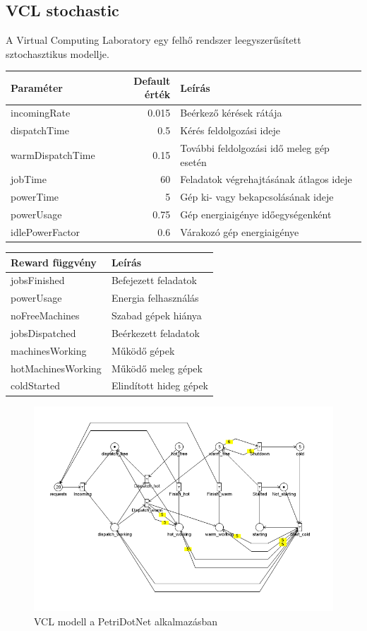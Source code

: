 \subsection{VCL stochastic}

A Virtual Computing Laboratory egy felhő rendszer leegyszerűsített sztochasztikus modellje.
\begin{center}
	\begin{tabular}{lrl}
		\textbf{\textbf{Paraméter}} & \textbf{Default érték} & \textbf{Leírás} \\
		\hline
		incomingRate & 0.015 & Beérkező kérések rátája\\
		dispatchTime & 0.5 & Kérés feldolgozási ideje\\
		warmDispatchTime & 0.15 & További feldolgozási idő meleg gép esetén\\
		jobTime & 60 & Feladatok végrehajtásának átlagos ideje\\
		powerTime & 5 & Gép ki- vagy bekapcsolásának ideje\\
		powerUsage & 0.75 & Gép energiaigénye időegységenként\\
		idlePowerFactor & 0.6 & Várakozó gép energiaigénye\\
	\end{tabular}
	\quad
	\begin{tabular}{ll}
		\textbf{\textbf{Reward függvény}} & \textbf{Leírás}\\
		\hline
		jobsFinished & Befejezett feladatok\\
		powerUsage & Energia felhasználás\\
		noFreeMachines & Szabad gépek hiánya\\
		jobsDispatched & Beérkezett feladatok\\
		machinesWorking & Működő gépek\\
		hotMachinesWorking & Működő meleg gépek\\
		coldStarted & Elindított hideg gépek\\
	\end{tabular}
\end{center}

\begin{figure}
	\centering
	\includegraphics[width=140mm, keepaspectratio]{figures/vcl.png}
	\caption{VCL modell a PetriDotNet alkalmazásban}
\end{figure}

